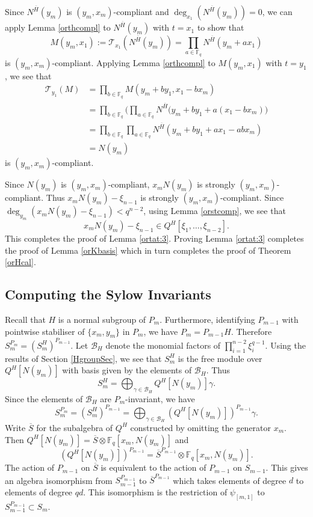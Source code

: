 \documentclass{amsart}
\newcommand{\field}{\mathbb{F}}
\newcommand{\BH}{\mathcal{B}_H}
\newcommand{\T}{\mathcal{T}}
\begin{document}
Since $N^{\overline{H}}(y_m)$ is $(y_m,x_m)$-compliant
and $\deg_{x_1}(N^{\overline{H}}(y_m))=0$,
we can apply Lemma \ref{orthcompl}  to $N^{\overline{H}}(y_m)$
with $t=x_1$ to show that
$$M(y_m,x_1) := \T_{x_1}(N^{\overline{H}}(y_m))=\prod_{a\in\field_q} N^{\overline{H}}(y_m+ax_1)$$
is $(y_m,x_m)$-compliant. Applying Lemma \ref{orthcompl} to $M(y_m,x_1)$ with $t=y_1$, we see that
 \begin{align*}
\T_{y_1}(M) &= \prod_{b \in \field_q} M(y_m + b y_1,x_1-bx_m)\\
&= \prod_{b \in \field_q} \bigg(\prod_{a\in \field_q} N^{\overline{H}}(y_m+b y_1+a (x_1-bx_m)\bigg)\\
&  = \prod_{b \in \field_q} \prod_{a\in \field_q} N^{\overline{H}}(y_m+b y_1+a x_1 - ab x_m)\\
 & = N(y_m)
   \end{align*}
  is $(y_m,x_m)$-compliant. 
  
  Since $N(y_m)$ is $(y_m,x_m)$-compliant, $x_m N(y_m)$ is strongly $(y_m,x_m)$-compliant.
Thus $x_m N(y_m)-\xi_{n-1}$ is strongly $(y_m,x_m)$-compliant.
Since $\deg_{y_m}(x_m N(y_m)-\xi_{n-1})<q^{n-2}$, using Lemma \ref{orstcomp},
 we see that $$x_m N(y_m)-\xi_{n-1}\in Q^H[\xi_1,\dots,\xi_{n-2}].$$ This completes the proof of Lemma \ref{ortat:3}.
Proving  Lemma \ref{ortat:3} completes the proof of Lemma \ref{orKbasis} which in turn completes the proof of Theorem \ref{orHcal}.


    

\subsection{Computing the Sylow Invariants}
Recall that $H$ is a normal subgroup of $P_m$.
Furthermore, identifying $P_{m-1}$ with pointwise stabiliser of 
$\{x_m,y_m\}$ in $P_m$, we have $P_m=P_{m-1}H$.
Therefore
$S_m^{P_m}=(S_m^H)^{P_{m-1}}$. 
Let $\BH$ denote the monomial factors of $\prod_{i=1}^{n-2}\xi_{i}^{q-1}$.
Using the results of Section \ref{HgroupSec}, we see that $S_m^H$ is the free module over
$Q^H[N(y_m)]$ with basis given by the elements of $\BH$.
 Thus $$S_m^H=\bigoplus_{\gamma\in\BH} Q^H[N(y_m)]\gamma.$$
 Since the elements of $\BH$ are $P_m$-invariant, we have
 $$S_m^{P_m}=(S_m^H)^{P_{m-1}}=\bigoplus_{\gamma\in\BH }(Q^H[N(y_m)])^{P_{m-1}}\gamma.$$
 Write $\overline{S}$ for the subalgebra of $Q^H$ constructed by omitting the generator $x_m$.
 Then $Q^H[N(y_m)]=\overline{S}\otimes \field_q[x_m,N(y_m)]$ and
  $$(Q^H[N(y_m)])^{P_{m-1}}=\overline{S}^{P_{m-1}}\otimes \field_q[x_m,N(y_m)].$$
  The action of $P_{m-1}$ on $\overline{S}$ is equivalent to the action of  $P_{m-1}$ on $S_{m-1}$.
  This gives  an algebra isomorphism from $S_{m-1}^{P_{m-1}}$ to $\overline{S}^{P_{m-1}}$ which takes elements of degree $d$ to elements of degree $qd$.
  This isomorphism is the restriction of $\psi_{[m,1]}$ to 
  $S_{m-1}^{P_{m-1}}\subset S_m$.
\end{document}
